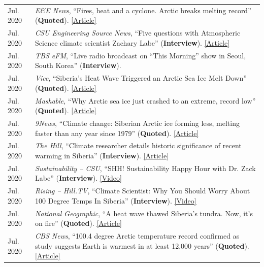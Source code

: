 \documentclass[margin,line,palatino,courier,10pt]{res}
\begin{document}
\begin{resume}
\begin{tabular}{@{}p{0.9in}p{4in}}
Jul. 2020 & \textit{E\&E News}, ``Fires, heat and a cyclone. Arctic breaks melting record'' (\textbf{Quoted}). \href{https://www.eenews.net/stories/1063658765}{[Article]}\\
Jul. 2020 & \textit{CSU Engineering Source News}, ``Five questions with Atmospheric Science climate scientist Zachary Labe'' (\textbf{Interview}). \href{https://engr.source.colostate.edu/five-questions-with-climate-scientist-zachary-labe/}{[Article]}\\
Jul. 2020 & \textit{TBS eFM}, ``Live radio broadcast on “This Morning” show in Seoul, South Korea'' (\textbf{Interview}).\\
Jul. 2020 & \textit{Vice}, ``Siberia's Heat Wave Triggered an Arctic Sea Ice Melt Down'' (\textbf{Quoted}). \href{https://www.vice.com/en_us/article/ep45be/siberias-heat-wave-triggered-an-arctic-sea-ice-melt-down}{[Article]}\\
Jul. 2020 & \textit{Mashable}, ``Why Arctic sea ice just crashed to an extreme, record low'' (\textbf{Quoted}). \href{https://mashable.com/article/arctic-sea-ice-plummets-2020/}{[Article]}\\
Jul. 2020 & \textit{9News}, ``Climate change: Siberian Arctic ice forming less, melting faster than any year since 1979'' (\textbf{Quoted}). \href{https://www.9news.com.au/world/climate-change-global-warming-siberian-heatwave-arctic-ice-melting-faster-us-research-data/}{[Article]}\\
Jul. 2020 & \textit{The Hill}, ``Climate researcher details historic significance of recent warming in Siberia'' (\textbf{Interview}). \href{https://thehill.com/hilltv/rising/507850-climate-researcher-details-historic-significance-of-recent-warming-in-siberia}{[Article]}\\
Jul. 2020 & \textit{Sustainability -- CSU}, ``SHH! Sustainability Happy Hour with Dr. Zack Labe'' (\textbf{Interview}). \href{https://www.youtube.com/watch?v=E6htTPoeXQ8&feature=youtu.be}{[Video]}\\
Jul. 2020 & \textit{Rising -- Hill.TV}, ``Climate Scientist: Why You Should Worry About 100 Degree Temps In Siberia'' (\textbf{Interview}). \href{https://www.youtube.com/watch?v=fw4fG-_aI28&feature=youtu.be}{[Video]}\\
Jul. 2020 & \textit{National Geographic}, ``A heat wave thawed Siberia’s tundra. Now, it’s on fire'' (\textbf{Quoted}). \href{https://www.nationalgeographic.com/science/2020/07/heat-wave-thawed-siberia-now-on-fire/#close}{[Article]}\\
Jul. 2020 & \textit{CBS News}, ``100.4 degree Arctic temperature record confirmed as study suggests Earth is warmest in at least 12,000 years'' (\textbf{Quoted}). \href{https://www.cbsnews.com/news/arctic-temperature-record-100-4-degrees-earth-warmest-12000-years/}{[Article]}\\

\end{tabular}
\end{resume}
\end{document}

